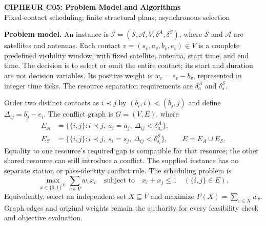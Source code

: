 \documentclass[10pt,a4paper]{article}
\begin{document}
\begin{center}
{\Large\bfseries CIPHEUR C05: Problem Model and Algorithms}\\[3pt]
{\small Fixed-contact scheduling; finite structural plans; asynchronous selection}
\end{center}

\textbf{Problem model.}
An instance is $\mathcal I=(\mathcal S,\mathcal A,V,\delta^A,\delta^S)$,
where $\mathcal S$ and $\mathcal A$ are satellites and antennas. Each contact
$v=(s_v,a_v,b_v,e_v)\in V$ is a complete predefined visibility window, with
fixed satellite, antenna, start time, and end time. The decision is to select
or omit the entire contact; its start and duration are not decision variables.
Its positive weight is $w_v=e_v-b_v$, represented in integer time ticks.
The resource separation requirements are $\delta^A_a$ and $\delta^S_s$.

Order two distinct contacts as $i\prec j$ by $(b_i,i)<(b_j,j)$ and define
$\Delta_{ij}=b_j-e_i$. The conflict graph is $G=(V,E)$, where
\begin{align*}
E_A&=\{\{i,j\}:i\prec j,\ a_i=a_j,\ \Delta_{ij}<\delta^A_{a_i}\},\\
E_S&=\{\{i,j\}:i\prec j,\ s_i=s_j,\ \Delta_{ij}<\delta^S_{s_i}\},
\qquad E=E_A\cup E_S.
\end{align*}
Equality to one resource's required gap is compatible for that resource;
the other shared resource can still introduce a conflict. The supplied
instance has no separate station or pass-identity conflict rule.
The scheduling problem is
\begin{equation}
\max_{x\in\{0,1\}^{|V|}}\sum_{v\in V}w_vx_v
\quad\text{subject to}\quad x_i+x_j\leq1\quad(\{i,j\}\in E).
\label{eq:model}
\end{equation}
Equivalently, select an independent set $X\subseteq V$ and maximize
$F(X)=\sum_{v\in X}w_v$. Graph edges and original weights remain the
authority for every feasibility check and objective evaluation.
\end{document}
